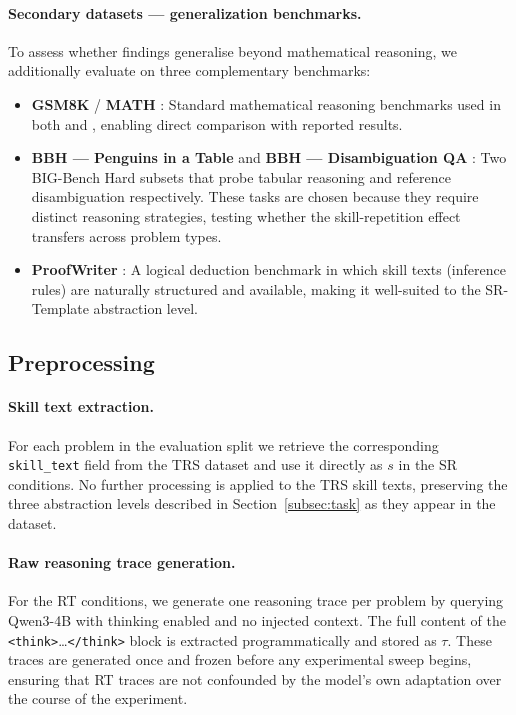 \paragraph{Secondary datasets — generalization benchmarks.}
To assess whether findings generalise beyond mathematical reasoning, we additionally
evaluate on three complementary benchmarks:

\begin{itemize}
  \item \textbf{GSM8K} \cite{cobbe2021gsm8k} / \textbf{MATH} \cite{hendrycks2021math}:
        Standard mathematical reasoning benchmarks used in both
        \citet{leviathan2025prompt} and \citet{wang2025harm}, enabling direct
        comparison with reported results.
  \item \textbf{BBH — Penguins in a Table} and \textbf{BBH — Disambiguation QA}
        \cite{suzgun2022bbh}: Two BIG-Bench Hard subsets that probe tabular
        reasoning and reference disambiguation respectively.
        These tasks are chosen because they require distinct reasoning strategies,
        testing whether the skill-repetition effect transfers across problem types.
  \item \textbf{ProofWriter} \cite{tafjord2021proofwriter}: A logical deduction
        benchmark in which skill texts (inference rules) are naturally structured
        and available, making it well-suited to the SR-Template abstraction level.
\end{itemize}

\subsection{Preprocessing}
\label{subsec:preprocessing}

\paragraph{Skill text extraction.}
For each problem in the evaluation split we retrieve the corresponding
\texttt{skill\_text} field from the TRS dataset and use it directly as $s$ in
the SR conditions.
No further processing is applied to the TRS skill texts, preserving the three
abstraction levels described in Section~\ref{subsec:task} as they appear in
the dataset.

\paragraph{Raw reasoning trace generation.}
For the RT conditions, we generate one reasoning trace per problem by querying
Qwen3-4B with thinking enabled and no injected context.
The full content of the \texttt{<think>}\ldots\texttt{</think>} block is extracted
programmatically and stored as $\tau$.
These traces are generated once and frozen before any experimental sweep begins,
ensuring that RT traces are not confounded by the model's own adaptation over the course
of the experiment.

